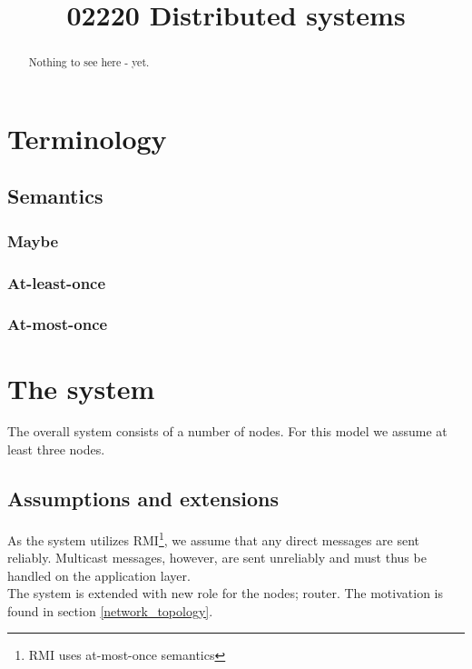 \documentclass[10pt,a4paper]{article}
\begin{document}
\title{02220 Distributed systems}

\maketitle

\tableofcontents

\begin{abstract}
Nothing to see here - yet.
\end{abstract}

\section{Terminology}

\subsection{Semantics}

\subsubsection{Maybe}
\subsubsection{At-least-once}
\subsubsection{At-most-once}

\section{The system}

The overall system consists of a number of nodes. For this model we assume at least three nodes.

\subsection{Assumptions and extensions}
As the system utilizes RMI\footnote{RMI uses at-most-once semantics}, we assume that any direct messages are sent reliably. Multicast messages, however, are sent unreliably and must thus be handled on the application layer.\\

The system is extended with new role for the nodes; router. The motivation is found in section \ref{network_topology}.
\end{document}
